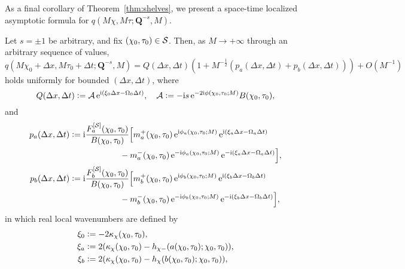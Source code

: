 As a final corollary of Theorem~\ref{thm:shelves}, we present a space-time localized asymptotic formula for $q(M\chi,M\tau;\mathbf{Q}^{-s},M)$.
\begin{corollary}
Let $s=\pm 1$ be arbitrary, and fix $(\chi_0,\tau_0)\in\mathcal{S}$.  Then, as $M\to+\infty$ through an arbitrary sequence of values,
\begin{equation}
q(M\chi_0+\Delta x,M\tau_0+\Delta t;\mathbf{Q}^{-s},M)=Q(\Delta x,\Delta t)\left(1+M^{-\frac{1}{2}}\left(p_a(\Delta x,\Delta t)+p_b(\Delta x,\Delta t)\right)\right)+O(M^{-1})
\label{eq:Q-perturbation-shelves}
\end{equation}
holds uniformly for bounded $(\Delta x,\Delta t)$, where 
\begin{equation}
Q(\Delta x,\Delta t)\vcentcolon= \mathcal{A}\,\mathrm{e}^{\mathrm{i}(\xi_0\Delta x-\Omega_0\Delta t)},\quad \mathcal{A}\vcentcolon= -\mathrm{i} s\,\mathrm{e}^{-2\mathrm{i}\phi(\chi_0,\tau_0;M)}B(\chi_0,\tau_0),
\label{eq:leading-plane-wave-intro}
\end{equation}
and
\begin{equation}
\begin{split}
p_a(\Delta x,\Delta t)&\vcentcolon= \mathrm{i}\frac{F_a^{[\mathcal{S}]}(\chi_0,\tau_0)}{B(\chi_0,\tau_0)}\Big[
m_a^+(\chi_0,\tau_0)\,\mathrm{e}^{\mathrm{i}\phi_a(\chi_0,\tau_0;M)}\,\mathrm{e}^{\mathrm{i}(\xi_a\Delta x-\Omega_a\Delta t)} \\
&\qquad\qquad\qquad {}- 
m_a^-(\chi_0,\tau_0)\,\mathrm{e}^{-\mathrm{i}\phi_a(\chi_0,\tau_0;M)}\,\mathrm{e}^{-\mathrm{i}(\xi_a\Delta x-\Omega_a\Delta t)}\Big],\\
p_b(\Delta x,\Delta t)&\vcentcolon= \mathrm{i}\frac{F_b^{[\mathcal{S}]}(\chi_0,\tau_0)}{B(\chi_0,\tau_0)}\Big[
m_b^+(\chi_0,\tau_0)\,\mathrm{e}^{\mathrm{i}\phi_b(\chi_0,\tau_0;M)}\,\mathrm{e}^{\mathrm{i}(\xi_b\Delta x-\Omega_b\Delta t)} \\
&\qquad\qquad\qquad {}- 
m_b^-(\chi_0,\tau_0)\,\mathrm{e}^{-\mathrm{i}\phi_b(\chi_0,\tau_0;M)}\,\mathrm{e}^{-\mathrm{i}(\xi_b\Delta x-\Omega_b\Delta t)}\Big],
\end{split}
\label{eq:p-a-b-shelves}
\end{equation}
in which real local wavenumbers are defined by
\begin{equation}
\begin{split}
\xi_0&\vcentcolon= -2\kappa_\chi(\chi_0,\tau_0),\\
\xi_a&\vcentcolon= 2(\kappa_\chi(\chi_0,\tau_0)-h_{\chi-}(a(\chi_0,\tau_0);\chi_0,\tau_0)),\\
\xi_b&\vcentcolon= 2(\kappa_\chi(\chi_0,\tau_0)-h_{\chi}(b(\chi_0,\tau_0);\chi_0,\tau_0)),
\end{split}
\label{eq:wavenumbers-intro}
\end{equation}

\end{corollary}
